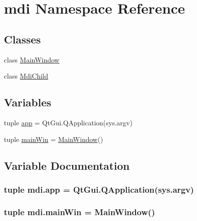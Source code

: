 \hypertarget{namespacemdi}{}\section{mdi Namespace Reference}
\label{namespacemdi}
\subsection*{Classes}
\begin{DoxyCompactItemize}
\item 
class \hyperlink{classmdi_1_1MainWindow}{Main\+Window}
\item 
class \hyperlink{classmdi_1_1MdiChild}{Mdi\+Child}
\end{DoxyCompactItemize}
\subsection*{Variables}
\begin{DoxyCompactItemize}
\item 
tuple \hyperlink{namespacemdi_a5b184e6f6ab9cb90514b30f139fbc4c8}{app} = Qt\+Gui.\+Q\+Application(sys.\+argv)
\item 
tuple \hyperlink{namespacemdi_abbe207f4e7f32f66b8430fb7f54a0d16}{main\+Win} = \hyperlink{classmdi_1_1MainWindow}{Main\+Window}()
\end{DoxyCompactItemize}


\subsection{Variable Documentation}
\hypertarget{namespacemdi_a5b184e6f6ab9cb90514b30f139fbc4c8}{}
\subsubsection[{app}]{\setlength{\rightskip}{0pt plus 5cm}tuple mdi.\+app = Qt\+Gui.\+Q\+Application(sys.\+argv)}\label{namespacemdi_a5b184e6f6ab9cb90514b30f139fbc4c8}
\hypertarget{namespacemdi_abbe207f4e7f32f66b8430fb7f54a0d16}{}
\subsubsection[{main\+Win}]{\setlength{\rightskip}{0pt plus 5cm}tuple mdi.\+main\+Win = {\bf Main\+Window}()}\label{namespacemdi_abbe207f4e7f32f66b8430fb7f54a0d16}
